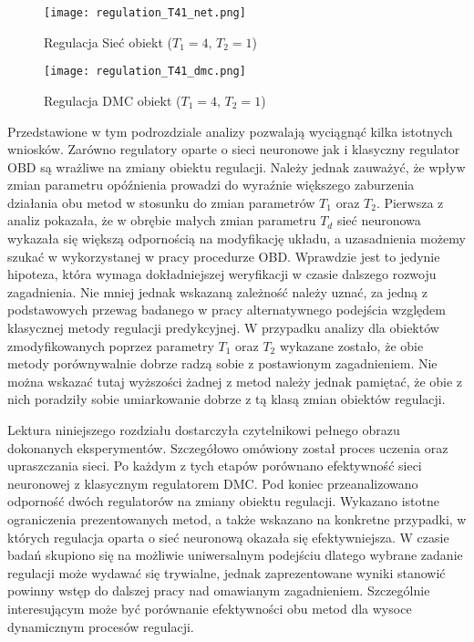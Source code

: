 \begin{figure}[!h]
\centering
\begin{minipage}{.5\textwidth}
  \label{fig:Regulation-T41-net}
  \centering \texttt{[image: regulation\_T41\_net.png]}
  \caption{Regulacja Sieć obiekt (\( T_1=4, \, T_2=1 \))}
  \label{fig:test1}
\end{minipage}%
\begin{minipage}{.5\textwidth}
  \label{fig:Regulation-T41-dmc}
  \centering \texttt{[image: regulation\_T41\_dmc.png]}
  \caption{Regulacja DMC obiekt (\( T_1=4, \, T_2=1 \))}
\end{minipage}
\end{figure}

\par Przedstawione w tym podrozdziale analizy pozwalają wyciągnąć kilka istotnych wniosków. Zarówno regulatory oparte o sieci neuronowe jak i klasyczny regulator OBD są wrażliwe na zmiany obiektu regulacji. Należy jednak zauważyć, że wpływ zmian parametru opóźnienia prowadzi do wyraźnie większego zaburzenia działania obu metod w stosunku do zmian parametrów \(T_1 \) oraz \(T_2\). Pierwsza z analiz pokazała, że w obrębie małych zmian parametru \(T_d\) sieć neuronowa wykazała się większą odpornością na modyfikację układu, a uzasadnienia możemy szukać w wykorzystanej w pracy procedurze OBD. Wprawdzie jest to jedynie hipoteza, która wymaga dokładniejszej weryfikacji w czasie dalszego rozwoju zagadnienia. Nie mniej jednak wskazaną zależność należy uznać, za jedną z podstawowych przewag badanego w pracy alternatywnego podejścia względem klasycznej metody regulacji predykcyjnej. W przypadku analizy dla obiektów zmodyfikowanych poprzez parametry \(T_1 \) oraz \(T_2\) wykazane zostało, że obie metody porównywalnie dobrze radzą sobie z postawionym zagadnieniem. Nie można wskazać tutaj wyższości żadnej z metod należy jednak pamiętać, że obie z nich poradziły sobie umiarkowanie dobrze z tą klasą zmian obiektów regulacji.

\vspace{10mm}

\par Lektura niniejszego rozdziału dostarczyła czytelnikowi pełnego obrazu dokonanych eksperymentów. Szczegółowo omówiony został proces uczenia oraz upraszczania sieci. Po każdym z tych etapów porównano efektywność sieci neuronowej z klasycznym regulatorem DMC. Pod koniec przeanalizowano odporność dwóch regulatorów na zmiany obiektu regulacji. Wykazano istotne ograniczenia prezentowanych metod, a także wskazano na konkretne przypadki, w których regulacja oparta o sieć neuronową okazała się efektywniejsza. W czasie badań skupiono się na możliwie uniwersalnym podejściu dlatego wybrane zadanie regulacji może wydawać się trywialne, jednak zaprezentowane wyniki stanowić powinny wstęp do dalszej pracy nad omawianym zagadnieniem. Szczególnie interesującym może być porównanie efektywności obu metod dla wysoce dynamicznym procesów regulacji.  
